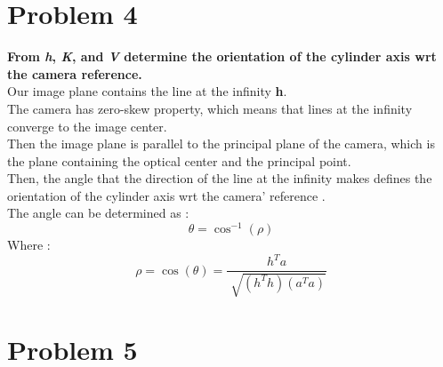 \documentclass[a4paper, 11pt, oneside, openright, english]{book}
\begin{document}
\section{Problem 4}
\textbf{From \textit{h}, \textit{K}, and \textit{V} determine the orientation of the cylinder axis wrt the camera reference.}\\
Our image plane contains the line at the infinity \textbf{h}.\\
The camera has zero-skew property, which means that lines at the infinity converge to the image center.\\
Then the image plane is parallel to the principal plane of the camera, which is the plane containing the optical center and the principal point.\\
Then, the angle that the direction of the line at the infinity makes defines the orientation of the cylinder axis wrt the camera' reference .
\\The  angle can be determined as :
\begin{equation}
    \theta = \cos ^{-1}(\rho )
\end{equation}
Where : 
\begin{equation}
    \rho  = \cos(\theta) = \frac{h^{T}a}{\sqrt[]{(h^{T}h)(a^{T}a)}}
\end{equation}
\section{Problem 5}
\end{document}
